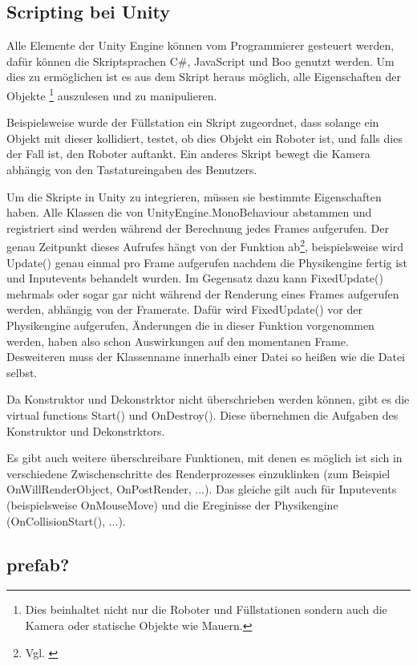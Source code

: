\subsection{Scripting bei Unity}
Alle Elemente der Unity Engine k{\"{o}}nnen vom Programmierer gesteuert werden, daf{\"{u}}r k{\"{o}}nnen
die Skriptsprachen C\#, JavaScript und Boo genutzt werden.\cite{wiki:unity}
Um dies zu erm{\"{o}}glichen ist es aus dem Skript heraus m{\"{o}}glich, alle Eigenschaften
der Objekte \footnote{Dies beinhaltet nicht nur die Roboter und F{\"{u}}llstationen sondern auch die Kamera
oder statische Objekte wie Mauern.} auszulesen und zu manipulieren.

Beispielsweise wurde der F{\"{u}}llstation ein Skript zugeordnet, dass solange ein Objekt mit dieser kollidiert, testet, ob dies Objekt ein Roboter ist, und falls dies der Fall ist,
den Roboter auftankt. Ein anderes Skript bewegt die Kamera abh{\"{a}}ngig von den Tastatureingaben des Benutzers.

Um die Skripte in Unity zu integrieren, m{\"{u}}ssen sie bestimmte Eigenschaften haben. Alle Klassen die von UnityEngine.MonoBehaviour
abstammen und registriert sind werden w{\"{a}}hrend der Berechnung jedes Frames aufgerufen. Der genau Zeitpunkt dieses Aufrufes h{\"{a}}ngt von
der Funktion ab\footnote{Vgl. \cite{unity-exex-order}}, beispielsweise wird Update() genau einmal pro Frame aufgerufen nachdem die Physikengine fertig ist
und Inputevents behandelt wurden. Im Gegensatz dazu kann FixedUpdate() mehrmals oder sogar gar nicht w{\"{a}}hrend der Renderung eines Frames aufgerufen
werden, abh{\"{a}}ngig von der Framerate. Daf{\"{u}}r wird FixedUpdate() vor der Physikengine aufgerufen, {\"{A}}nderungen die in dieser
Funktion vorgenommen werden, haben also schon Auswirkungen auf den momentanen Frame. Desweiteren muss der Klassenname innerhalb einer Datei so
hei{\ss}en wie die Datei selbst.

Da Konstruktor und Dekonstrktor nicht {\"{u}}berschrieben werden k{\"{o}}nnen, gibt es die virtual functions Start() und OnDestroy(). Diese
{\"{u}}bernehmen die Aufgaben des Konstruktor und Dekonstrktors.

Es gibt auch weitere {\"{u}}berschreibare Funktionen, mit denen es m{\"{o}}glich ist sich in verschiedene Zwischenschritte des Renderprozesses
einzuklinken (zum Beispiel OnWillRenderObject, OnPostRender, ...). Das gleiche gilt auch f{\"{u}}r Inputevents (beispielsweise OnMouseMove) und
die Ereginisse der Physikengine (OnCollisionStart(), ...).

\subsection{prefab?}

